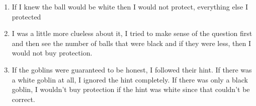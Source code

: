 \documentclass[12pt,a4paper]{article}
\begin{document}
\begin{enumerate}
\item If I knew the ball would be white then I would not protect, everything else I protected

\item I was a little more clueless about it, I tried to make sense of the question first and then see the number of balls that were black and if they were less, then I would not buy protection.

\item If the goblins were guaranteed to be honest, I followed their hint. If there was a white goblin at all, I ignored the hint completely. If there was only a black goblin, I wouldn't buy protection if the hint was white since that couldn't be correct.


\end{enumerate}


\renewcommand{\contentsname}{\vspace{-1em}}

\setcounter{table}{0}
\setcounter{figure}{0}
\setcounter{equation}{0}
\setcounter{footnote}{0}
\setcounter{section}{0}
\renewcommand\thesection{\Alph{section}}
\renewcommand\theequation{\thesection.\arabic{equation}}
\renewcommand\thetable{\thesection.\arabic{table}}
\renewcommand\thefigure{\thesection.\arabic{figure}}
\renewcommand\thesubsection{\Roman{subsection}}
\end{document}
